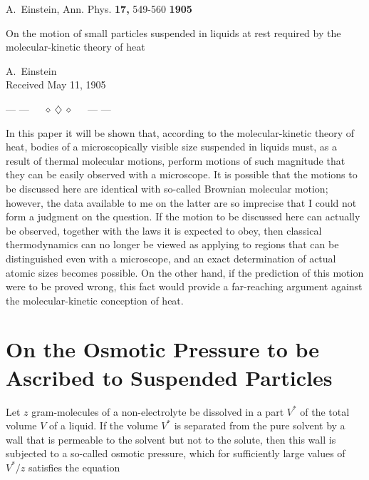 \documentclass{article}
\begin{document}
A.~Einstein, Ann. Phys. {\bf 17,} 549-560 \hfill {\large \bf 1905}\\[2cm]

\begin{center}
{\Large On the motion of small particles suspended in liquids at rest required by the molecular-kinetic theory of heat}\\
\end{center}

\vspace{0.5cm}

\begin{center}
A.~Einstein\\
Received May 11, 1905\\
\end{center}

\centerline{--- ---~~~$\diamond~\diamondsuit~\diamond$~~~--- ---}

\vspace{1cm}

In this paper it will be shown that, according to the molecular-kinetic theory of heat,
bodies of a microscopically visible size suspended in liquids must, as a result of thermal molecular
motions, perform motions of such magnitude that they can be easily observed with a microscope.
It is possible that the motions to be discussed here are identical with so-called Brownian molecular
motion; however, the data available to me on the latter are so imprecise that I could not form a
judgment on the question. If the motion to be discussed here can actually be observed, together
with the laws it is expected to obey, then classical thermodynamics can no longer be viewed as
applying to regions that can be distinguished even with a microscope, and an exact determination
of actual atomic sizes becomes possible. On the other hand, if the prediction of this motion were
to be proved wrong, this fact would provide a far-reaching argument against the molecular-kinetic
conception of heat.

\section{On the Osmotic Pressure to be Ascribed to Suspended Particles}

Let $z$ gram-molecules of a non-electrolyte be dissolved in a part $V^{*}$ of the total volume $V$ of a
liquid. If the volume $V^{*}$ is separated from the pure solvent by a wall that is permeable to the
solvent but not to the solute, then this wall is subjected to a so-called osmotic pressure, which for
sufficiently large values of $V^{*}/z$ satisfies the equation
\end{document}
